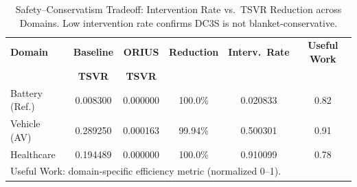 \begin{table}[htbp]
\centering
\caption{Safety--Conservatism Tradeoff: Intervention Rate vs.\ TSVR Reduction across Domains. Low intervention rate confirms DC3S is not blanket-conservative.}
\label{tbl:intervention_tradeoff}
\begin{tabular}{lccccc}
\toprule
\textbf{Domain} & \textbf{Baseline} & \textbf{ORIUS} & \textbf{Reduction} & \textbf{Interv.\ Rate} & \textbf{Useful Work} \\
& \textbf{TSVR} & \textbf{TSVR} & & & \\
\midrule
Battery (Ref.) & 0.008300 & 0.000000 & 100.0\% & 0.020833 & 0.82 \\
Vehicle (AV) & 0.289250 & 0.000163 & 99.94\% & 0.500301 & 0.91 \\
Healthcare & 0.194489 & 0.000000 & 100.0\% & 0.910099 & 0.78 \\
\bottomrule
\multicolumn{6}{l}{\small Useful Work: domain-specific efficiency metric (normalized 0--1).}\\
\end{tabular}
\end{table}
